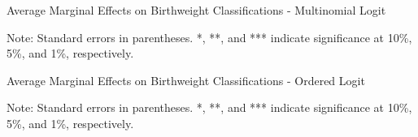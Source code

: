\documentclass[letterpaper]{article}
\begin{document}
\begin{spacing}{1.2}
	\begin{table}[H] 
	\caption{Average Marginal Effects on Birthweight Classifications - Multinomial Logit}
	\centering
	\renewcommand\arraystretch{1.25}        
	\begin{threeparttable}
	\footnotesize
	
	    \begin{tablenotes}
	    \footnotesize 
	        Note: Standard errors in parentheses. *, **, and *** indicate significance at 10\%, 5\%, and 1\%, respectively. \\
	    \end{tablenotes}
	\end{threeparttable}
	\end{table}

\begin{table}[H] 
	\caption{Average Marginal Effects on Birthweight Classifications - Ordered Logit}
	\centering
	\renewcommand\arraystretch{1.25}        
	\begin{threeparttable}
	\footnotesize
	
	    \begin{tablenotes}
	    \footnotesize 
	        Note: Standard errors in parentheses. *, **, and *** indicate significance at 10\%, 5\%, and 1\%, respectively. \\
	    \end{tablenotes}
	\end{threeparttable}
	\end{table}


\end{spacing}
\end{document}
